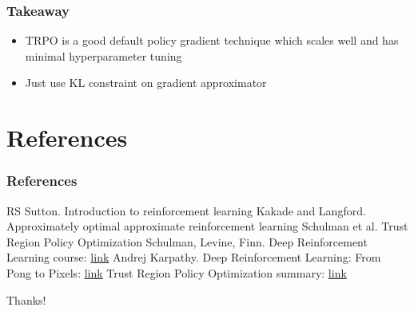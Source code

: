 \documentclass{beamer}
\begin{document}
\begin{frame}
  \frametitle{Takeaway}
  \begin{itemize}
    \item TRPO is a good default policy gradient technique which scales well and has minimal hyperparameter tuning
    \item Just use KL constraint on gradient approximator
  \end{itemize}
\end{frame}



\section{References}

\begin{frame}
  \frametitle{References}
  \footnotesize{
    \begin{thebibliography}{99} %
      \bibitem[]{} RS Sutton. Introduction to reinforcement learning
      \bibitem[]{} Kakade and Langford. Approximately optimal approximate reinforcement learning
      \bibitem[]{} Schulman et al. Trust Region Policy Optimization
      \bibitem[]{} Schulman, Levine, Finn. Deep Reinforcement Learning course: \href{http://rll.berkeley.edu/deeprlcourse/}{link}
      \bibitem[]{} Andrej Karpathy. Deep Reinforcement Learning: From Pong to Pixels: \href{http://karpathy.github.io/2016/05/31/rl/}{link}
      \bibitem[]{} Trust Region Policy Optimization summary: \href{https://jmk.pe.kr/media/attachments/5bcf0aca45da310a434bbc093799c85e/trpo.pdf}{link}
  \end{thebibliography}
}
\end{frame}


\begin{frame}
  \Huge{\centerline{Thanks!}}
\end{frame}

\end{document}
